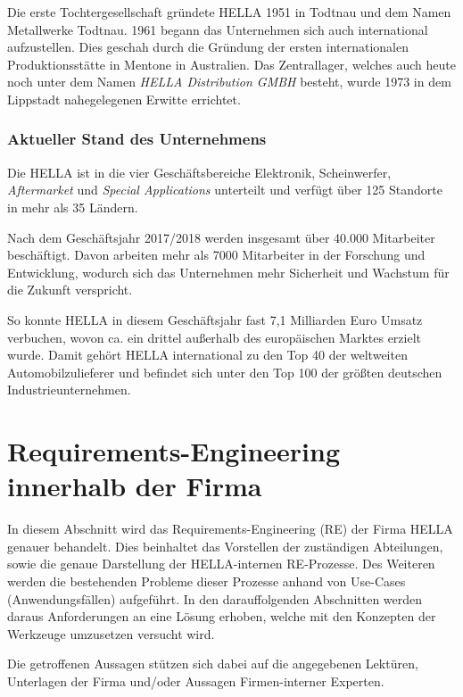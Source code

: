 \documentclass[12pt]{report}
\begin{document}
Die erste Tochtergesellschaft gründete HELLA 1951 in Todtnau und dem Namen \glqq Metallwerke Todtnau\grqq. 1961 begann das Unternehmen sich auch international aufzustellen. Dies geschah durch die Gründung der ersten internationalen Produktionsstätte in Mentone in Australien. 
Das Zentrallager, welches auch heute noch unter dem Namen \textit{HELLA Distribution GMBH} besteht, wurde 1973 in dem Lippstadt nahegelegenen Erwitte errichtet. 
\subsubsection[Aktueller Stand]{Aktueller Stand des Unternehmens}
Die HELLA ist in die vier Geschäftsbereiche Elektronik, Scheinwerfer, \textit{Aftermarket} und \textit{Special Applications} unterteilt und verfügt über 125 Standorte in mehr als 35 Ländern.

Nach dem Geschäftsjahr 2017/2018 werden insgesamt über 40.000 Mitarbeiter beschäftigt. Davon arbeiten mehr als 7000 Mitarbeiter in der Forschung und Entwicklung, wodurch sich das Unternehmen mehr Sicherheit und Wachstum für die Zukunft verspricht. 

So konnte HELLA in diesem Geschäftsjahr fast 7,1 Milliarden Euro Umsatz verbuchen, wovon ca. ein drittel außerhalb des europäischen Marktes erzielt wurde. Damit gehört HELLA international zu den Top 40 der weltweiten Automobilzulieferer und befindet sich unter den Top 100 der größten deutschen Industrieunternehmen. 

\section[RE bei HELLA]{Requirements-Engineering innerhalb der Firma}
In diesem Abschnitt wird das Requirements-Engineering (RE) der Firma HELLA genauer behandelt. Dies beinhaltet das Vorstellen der zuständigen Abteilungen, sowie die genaue Darstellung der HELLA-internen RE-Prozesse. Des Weiteren werden die bestehenden Probleme dieser Prozesse anhand von Use-Cases (Anwendungsfällen) aufgeführt. In den darauffolgenden Abschnitten werden daraus Anforderungen an eine Lösung erhoben, welche mit den Konzepten der Werkzeuge umzusetzen versucht wird.

Die getroffenen Aussagen stützen sich dabei auf die angegebenen Lektüren, Unterlagen der Firma und/oder Aussagen Firmen-interner Experten. 
\end{document}

